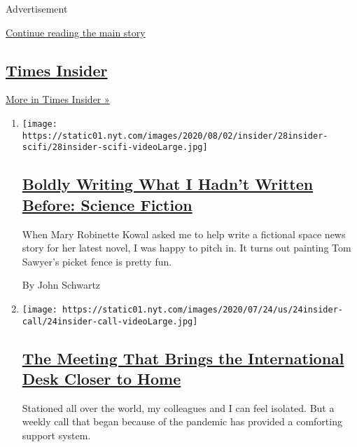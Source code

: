 Advertisement

\protect\hyperlink{after-mid1}{Continue reading the main story}

\hypertarget{times-insider-3}{%
\subsection{\texorpdfstring{\href{/series/times-insider}{Times
Insider}}{Times Insider}}\label{times-insider-3}}

\href{/series/times-insider}{More in Times Insider »}

\begin{enumerate}
\def\labelenumi{\arabic{enumi}.}
\item
  \texttt{[image: https://static01.nyt.com/images/2020/08/02/insider/28insider-scifi/28insider-scifi-videoLarge.jpg]}

  \hypertarget{boldly-writing-what-i-hadnt-written-before-science-fiction}{%
  \subsection{\texorpdfstring{\href{/2020/07/28/insider/science-fiction-novel-mary-robinette-kowal.html}{Boldly
  Writing What I Hadn't Written Before: Science
  Fiction}}{Boldly Writing What I Hadn't Written Before: Science Fiction}}\label{boldly-writing-what-i-hadnt-written-before-science-fiction}}

  When Mary Robinette Kowal asked me to help write a fictional space
  news story for her latest novel, I was happy to pitch in. It turns out
  painting Tom Sawyer's picket fence is pretty fun.

  By John Schwartz
\item
  \texttt{[image: https://static01.nyt.com/images/2020/07/24/us/24insider-call/24insider-call-videoLarge.jpg]}

  \hypertarget{the-meeting-that-brings-the-international-desk-closer-to-home}{%
  \subsection{\texorpdfstring{\href{/2020/07/24/insider/international-journalists-meeting.html}{The
  Meeting That Brings the International Desk Closer to
  Home}}{The Meeting That Brings the International Desk Closer to Home}}\label{the-meeting-that-brings-the-international-desk-closer-to-home}}

  Stationed all over the world, my colleagues and I can feel isolated.
  But a weekly call that began because of the pandemic has provided a
  comforting support system.


\end{enumerate}
